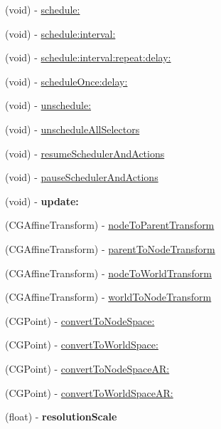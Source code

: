 \begin{DoxyCompactItemize}
\item 
(void) -\/ \hyperlink{class_c_c_node_afe99d609f17c4c849e4543805ffeceab}{schedule\-:}
\item 
(void) -\/ \hyperlink{class_c_c_node_a7e0c230d398bba56d690e025544cb745}{schedule\-:interval\-:}
\item 
(void) -\/ \hyperlink{class_c_c_node_ae12c910d6f81e4734aa575d70b3d4d45}{schedule\-:interval\-:repeat\-:delay\-:}
\item 
(void) -\/ \hyperlink{class_c_c_node_ade03a2eb49bdf2683e8aee8dcc17c7b0}{schedule\-Once\-:delay\-:}
\item 
(void) -\/ \hyperlink{class_c_c_node_a0226f1400d9401dc6b3d392e4d2d081e}{unschedule\-:}
\item 
(void) -\/ \hyperlink{class_c_c_node_ae7e3b84d0a37ce086f1ca383302e53d2}{unschedule\-All\-Selectors}
\item 
(void) -\/ \hyperlink{class_c_c_node_addb189bc4c6130cc5061f736d9b2fbe5}{resume\-Scheduler\-And\-Actions}
\item 
(void) -\/ \hyperlink{class_c_c_node_aea76a02e08a52a43dd3b0b7f9c5e4381}{pause\-Scheduler\-And\-Actions}
\item 
\hypertarget{class_c_c_node_a9c166dc62e7ad0ca7dee98c3e3221a1c}{(void) -\/ {\bfseries update\-:}}\label{class_c_c_node_a9c166dc62e7ad0ca7dee98c3e3221a1c}

\item 
(C\-G\-Affine\-Transform) -\/ \hyperlink{class_c_c_node_a2206d591f9ddf155833c3132702e10ef}{node\-To\-Parent\-Transform}
\item 
(C\-G\-Affine\-Transform) -\/ \hyperlink{class_c_c_node_aa6d2bef57768f2d9bc2e614e0c720b9b}{parent\-To\-Node\-Transform}
\item 
(C\-G\-Affine\-Transform) -\/ \hyperlink{class_c_c_node_a15e02989939daa4511b9eac9b2e5cbb7}{node\-To\-World\-Transform}
\item 
(C\-G\-Affine\-Transform) -\/ \hyperlink{class_c_c_node_a3a3a51a1b2980da9b39f1d5c46f42d92}{world\-To\-Node\-Transform}
\item 
(C\-G\-Point) -\/ \hyperlink{class_c_c_node_a4ccc894a826322d62e5d2791c2deb36b}{convert\-To\-Node\-Space\-:}
\item 
(C\-G\-Point) -\/ \hyperlink{class_c_c_node_a3f43b7356576a39f137ff24960ced8f2}{convert\-To\-World\-Space\-:}
\item 
(C\-G\-Point) -\/ \hyperlink{class_c_c_node_a98f80737a3c10e01e72741995457642f}{convert\-To\-Node\-Space\-A\-R\-:}
\item 
(C\-G\-Point) -\/ \hyperlink{class_c_c_node_a34627158fb2910b7e24a190c2f866a27}{convert\-To\-World\-Space\-A\-R\-:}
\item 
\hypertarget{class_c_c_node_a9d4984d2e010f990d4c269a69888fef6}{(float) -\/ {\bfseries resolution\-Scale}}\label{class_c_c_node_a9d4984d2e010f990d4c269a69888fef6}


\end{DoxyCompactItemize}
